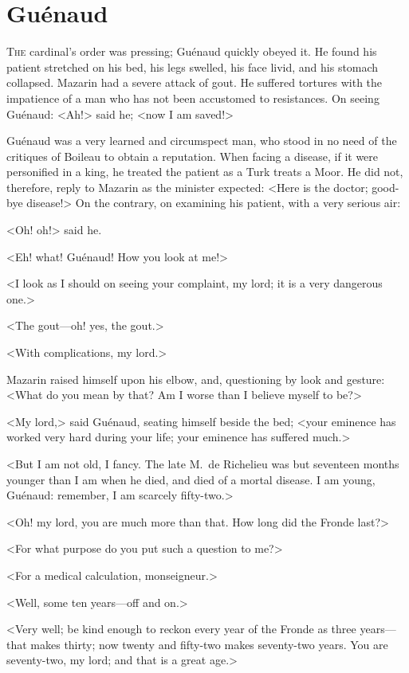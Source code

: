 \chapter{Guénaud}

\lettrine{T}{he} cardinal's order was pressing; Guénaud quickly obeyed it. He found his patient stretched on his bed, his legs swelled, his face livid, and his stomach collapsed. Mazarin had a severe attack of gout. He suffered tortures with the impatience of a man who has not been accustomed to resistances. On seeing Guénaud: <Ah!> said he; <now I am saved!>

Guénaud was a very learned and circumspect man, who stood in no need of the critiques of Boileau to obtain a reputation. When facing a disease, if it were personified in a king, he treated the patient as a Turk treats a Moor. He did not, therefore, reply to Mazarin as the minister expected: <Here is the doctor; good-bye disease!> On the contrary, on examining his patient, with a very serious air:

<Oh! oh!> said he.

<Eh! what! Guénaud! How you look at me!>

<I look as I should on seeing your complaint, my lord; it is a very dangerous one.>

<The gout—oh! yes, the gout.>

<With complications, my lord.>

Mazarin raised himself upon his elbow, and, questioning by look and gesture: <What do you mean by that? Am I worse than I believe myself to be?>

<My lord,> said Guénaud, seating himself beside the bed; <your eminence has worked very hard during your life; your eminence has suffered much.>

<But I am not old, I fancy. The late M.~de Richelieu was but seventeen months younger than I am when he died, and died of a mortal disease. I am young, Guénaud: remember, I am scarcely fifty-two.>

<Oh! my lord, you are much more than that. How long did the Fronde last?>

<For what purpose do you put such a question to me?>

<For a medical calculation, monseigneur.>

<Well, some ten years—off and on.>

<Very well; be kind enough to reckon every year of the Fronde as three years—that makes thirty; now twenty and fifty-two makes seventy-two years. You are seventy-two, my lord; and that is a great age.>

